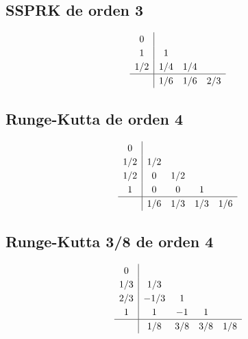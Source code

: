     \noindent\begin{minipage}[t]{.5\linewidth}
        \subsection{SSPRK de orden 3}
            \begin{equation}\label{eq:ssprk3}
                \renewcommand\arraystretch{1.2}
                \begin{array}{c|ccc}
                0\\
                1 & 1\\
                1/2 & 1/4 & 1/4\\
                \hline
                & 1/6 & 1/6 & 2/3
                \end{array}
            \end{equation}
    \end{minipage}%
    \begin{minipage}[t]{.5\linewidth}
        \subsection{Runge-Kutta de orden 4}
            \begin{equation}\label{eq:rk4}
                \renewcommand\arraystretch{1.2}
                \begin{array}{c|cccc}
                0\\
                1/2 & 1/2\\
                1/2 & 0 & 1/2\\
                1 & 0 & 0& 1\\
                \hline
                & 1/6 & 1/3 & 1/3 & 1/6
                \end{array}
            \end{equation}
    \end{minipage}
    
    \vfill
    
    \pagebreak

    \subsection{Runge-Kutta 3/8 de orden 4}
    \vspace{-10pt}
        \begin{equation}\label{eq:rk38}
            \renewcommand\arraystretch{1.2}
            \begin{array}{c|cccc}
            0\\
            1/3 & 1/3\\
            2/3 & -1/3 & 1\\
            1 & 1 & -1& 1\\
            \hline
            & 1/8 & 3/8 & 3/8 & 1/8
            \end{array}
        \end{equation}
    
